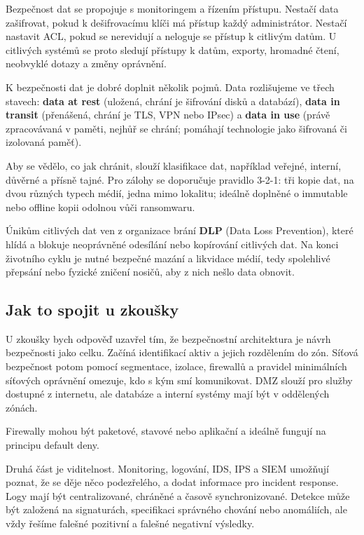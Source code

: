 Bezpečnost dat se propojuje s monitoringem a řízením přístupu. Nestačí data zašifrovat, pokud k dešifrovacímu klíči má přístup každý administrátor. Nestačí nastavit ACL, pokud se nerevidují a neloguje se přístup k citlivým datům. U citlivých systémů se proto sledují přístupy k datům, exporty, hromadné čtení, neobvyklé dotazy a změny oprávnění.

K bezpečnosti dat je dobré doplnit několik pojmů. Data rozlišujeme ve třech stavech: \textbf{data at rest} (uložená, chrání je šifrování disků a databází), \textbf{data in transit} (přenášená, chrání je TLS, VPN nebo IPsec) a \textbf{data in use} (právě zpracovávaná v paměti, nejhůř se chrání; pomáhají technologie jako šifrovaná či izolovaná paměť).

Aby se vědělo, co jak chránit, slouží klasifikace dat, například veřejné, interní, důvěrné a přísně tajné. Pro zálohy se doporučuje pravidlo 3-2-1: tři kopie dat, na dvou různých typech médií, jedna mimo lokalitu; ideálně doplněné o immutable nebo offline kopii odolnou vůči ransomwaru.

Únikům citlivých dat ven z organizace brání \textbf{DLP} (Data Loss Prevention), které hlídá a blokuje neoprávněné odesílání nebo kopírování citlivých dat. Na konci životního cyklu je nutné bezpečné mazání a likvidace médií, tedy spolehlivé přepsání nebo fyzické zničení nosičů, aby z nich nešlo data obnovit.

\subsection*{Jak to spojit u zkoušky}

U zkoušky bych odpověď uzavřel tím, že bezpečnostní architektura je návrh bezpečnosti jako celku. Začíná identifikací aktiv a jejich rozdělením do zón. Síťová bezpečnost potom pomocí segmentace, izolace, firewallů a pravidel minimálních síťových oprávnění omezuje, kdo s kým smí komunikovat. DMZ slouží pro služby dostupné z internetu, ale databáze a interní systémy mají být v oddělených zónách.

Firewally mohou být paketové, stavové nebo aplikační a ideálně fungují na principu default deny.

Druhá část je viditelnost. Monitoring, logování, IDS, IPS a SIEM umožňují poznat, že se děje něco podezřelého, a dodat informace pro incident response. Logy mají být centralizované, chráněné a časově synchronizované. Detekce může být založená na signaturách, specifikaci správného chování nebo anomáliích, ale vždy řešíme falešné pozitivní a falešné negativní výsledky.


